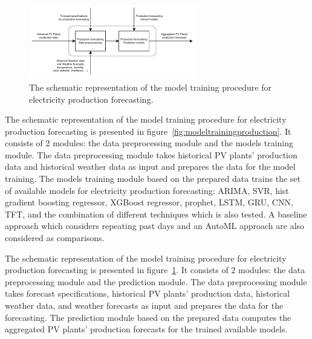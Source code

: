 \begin{figure}[H]
\centering
\includegraphics[width=0.65\textwidth]{images/system_model_forecasting_production}
\caption{The schematic representation of the model training procedure for electricity production forecasting.}
\label{fig:modelforecastingproduction}
\end{figure}

The schematic representation of the model training procedure for electricity production forecasting is presented in figure~\ref{fig:modeltrainingproduction}.
It consists of 2 modules: the data preprocessing module and the models training module.
The data preprocessing module takes historical PV plants' production data and historical weather data as input and prepares the data for the model training.
The models training module based on the prepared data trains the set of available models for electricity production forecasting: ARIMA, SVR, hist gradient boosting regressor, XGBoost regressor, prophet, LSTM, GRU, CNN, TFT, and the combination of different techniques which is also tested.
A baseline approach which considers repeating past days and an AutoML approach are also considered as comparisons.

The schematic representation of the model training procedure for electricity production forecasting is presented in figure~\ref{fig:modelforecastingproduction}.
It consists of 2 modules: the data preprocessing module and the prediction module.
The data preprocessing module takes forecast specifications, historical PV plants' production data, historical weather data, and weather forecasts as input and prepares the data for the forecasting.
The prediction module based on the prepared data computes the aggregated PV plants' production forecasts for the trained available models.
